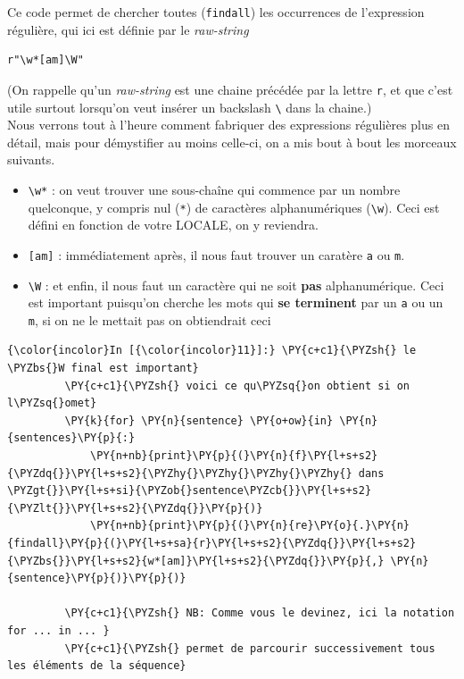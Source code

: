     Ce code permet de chercher toutes (\texttt{findall}) les occurrences de
l'expression régulière, qui ici est définie par le \emph{raw-string}

\begin{verbatim}
r"\w*[am]\W"
\end{verbatim}

(On rappelle qu'un \emph{raw-string} est une chaine précédée par la
lettre \texttt{r}, et que c'est utile surtout lorsqu'on veut insérer un
backslash \texttt{\textbackslash{}} dans la chaine.)\\

Nous verrons tout à l'heure comment fabriquer des expressions régulières
plus en détail, mais pour démystifier au moins celle-ci, on a mis bout à
bout les morceaux suivants.

\begin{itemize}
	\item 
	\texttt{\textbackslash{}w*} : on veut
	trouver une sous-chaîne qui commence par un nombre quelconque, y compris
	nul (\texttt{*}) de caractères alphanumériques
	(\texttt{\textbackslash{}w}). Ceci est défini en fonction de votre
	LOCALE, on y reviendra.
	\item
	\texttt{{[}am{]}} : immédiatement après, il
	nous faut trouver un caratère \texttt{a} ou \texttt{m}.
	\item
	\texttt{\textbackslash{}W} : et enfin, il nous faut un caractère qui ne
	soit \textbf{pas} alphanumérique. Ceci est important puisqu'on cherche
	les mots qui \textbf{se terminent} par un \texttt{a} ou un \texttt{m},
	si on ne le mettait pas on obtiendrait ceci
\end{itemize}

    \begin{Verbatim}[commandchars=\\\{\}]
{\color{incolor}In [{\color{incolor}11}]:} \PY{c+c1}{\PYZsh{} le \PYZbs{}W final est important}
         \PY{c+c1}{\PYZsh{} voici ce qu\PYZsq{}on obtient si on l\PYZsq{}omet}
         \PY{k}{for} \PY{n}{sentence} \PY{o+ow}{in} \PY{n}{sentences}\PY{p}{:}
             \PY{n+nb}{print}\PY{p}{(}\PY{n}{f}\PY{l+s+s2}{\PYZdq{}}\PY{l+s+s2}{\PYZhy{}\PYZhy{}\PYZhy{}\PYZhy{} dans \PYZgt{}}\PY{l+s+si}{\PYZob{}sentence\PYZcb{}}\PY{l+s+s2}{\PYZlt{}}\PY{l+s+s2}{\PYZdq{}}\PY{p}{)}
             \PY{n+nb}{print}\PY{p}{(}\PY{n}{re}\PY{o}{.}\PY{n}{findall}\PY{p}{(}\PY{l+s+sa}{r}\PY{l+s+s2}{\PYZdq{}}\PY{l+s+s2}{\PYZbs{}}\PY{l+s+s2}{w*[am]}\PY{l+s+s2}{\PYZdq{}}\PY{p}{,} \PY{n}{sentence}\PY{p}{)}\PY{p}{)}
             
         \PY{c+c1}{\PYZsh{} NB: Comme vous le devinez, ici la notation for ... in ... }
         \PY{c+c1}{\PYZsh{} permet de parcourir successivement tous les éléments de la séquence}
\end{Verbatim}


